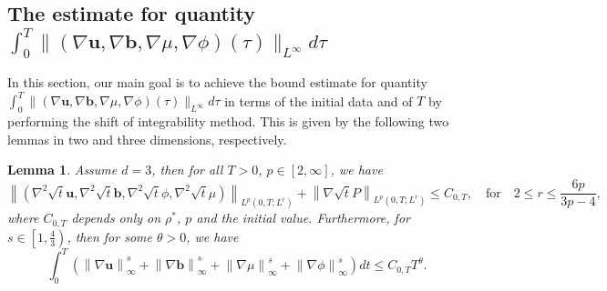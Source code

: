 \documentclass[11pt]{article}
\newtheorem{lemma}[theorem]{Lemma}
\numberwithin{equation}{section}
\begin{document}
\subsection{The estimate  for quantity $\int_{0}^{T}\|(\nabla \mathbf{u}, \nabla \mathbf{b}, \nabla \mu, \nabla\phi)(\tau)\|_{L^{\infty}}d\tau$}
\label{int}
In  this section, our main  goal is to achieve the bound  estimate  for quantity $\int_{0}^{T}\|(\nabla \mathbf{u}, \nabla \mathbf{b}, \nabla \mu, \nabla\phi)(\tau)\|_{L^{\infty}}d\tau$ in terms of the initial data and of $T$ by performing the shift of integrability method. This is given by the following two lemmas in two and three dimensions, respectively.
\begin{lemma}\label{3DDD}
Assume \( d = 3 \), then for all \( T > 0 \), \( p \in [2,\infty] \), we have
\begin{equation}\label{3DD}
\left\lVert (\nabla^2 \sqrt{t} \mathbf{u}, \nabla^2 \sqrt{t} \mathbf{b}, \nabla^2 \sqrt{t}\phi, \nabla^2 \sqrt{t} \mu) \right\rVert_{L^p(0,T;L^r)} + \left\lVert \nabla \sqrt{t} P \right\rVert_{L^p(0,T;L^r)} \leq C_{0,T}, \quad \text{for} \quad 2 \leq r \leq \frac{6p}{3p - 4},
\end{equation}
where \( C_{0,T} \) depends only on \( \rho^* \), \( p \) and the initial value. Furthermore, for \( s \in \left[1,\frac{4}{3}\right) \), then for some \( \theta > 0 \), we have
\begin{equation}
\int_0^T \left( \left\lVert \nabla \mathbf{u} \right\rVert_\infty^s +\left\lVert \nabla \mathbf{b} \right\rVert_\infty^s + \left\lVert \nabla \mu\right\rVert_\infty^s + \left\lVert \nabla\phi \right\rVert_\infty^s \right) dt \leq C_{0,T} T^\theta.\label{eq-s}
\end{equation}
\end{lemma}
\end{document}
